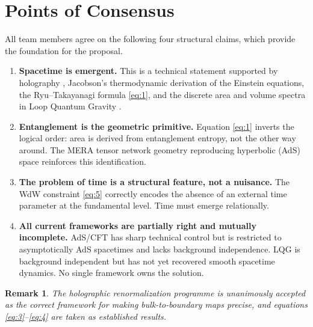 \documentclass[11pt,a4paper]{article}
\newtheorem{remark}{Remark}
\begin{document}
\section{Points of Consensus}

All team members agree on the following four structural claims, which provide
the foundation for the proposal.

\begin{enumerate}
  \item \textbf{Spacetime is emergent.}
    This is a technical statement supported by holography \cite{maldacena1997},
    Jacobson's thermodynamic derivation of the Einstein equations, the
    Ryu--Takayanagi formula \eqref{eq:1}, and the discrete area and volume
    spectra in Loop Quantum Gravity \cite{ashtekar2004,thiemann1996}.

  \item \textbf{Entanglement is the geometric primitive.}
    Equation \eqref{eq:1} inverts the logical order: area is derived from
    entanglement entropy, not the other way around.
    The MERA tensor network geometry reproducing hyperbolic (AdS) space
    reinforces this identification.

  \item \textbf{The problem of time is a structural feature, not a nuisance.}
    The WdW constraint \eqref{eq:5} correctly encodes the absence of an
    external time parameter at the fundamental level.
    Time must emerge relationally.

  \item \textbf{All current frameworks are partially right and mutually
    incomplete.}
    AdS/CFT \cite{maldacena1997,witten1998} has sharp technical control but
    is restricted to asymptotically AdS spacetimes and lacks background
    independence.
    LQG \cite{ashtekar2004,thiemann1996} is background independent but has
    not yet recovered smooth spacetime dynamics.
    No single framework owns the solution.
\end{enumerate}

\begin{remark}
  The holographic renormalization programme \cite{skenderis2002} is
  unanimously accepted as the correct framework for making
  bulk-to-boundary maps precise, and equations
  \eqref{eq:3}--\eqref{eq:4} are taken as established results.
\end{remark}
\end{document}
